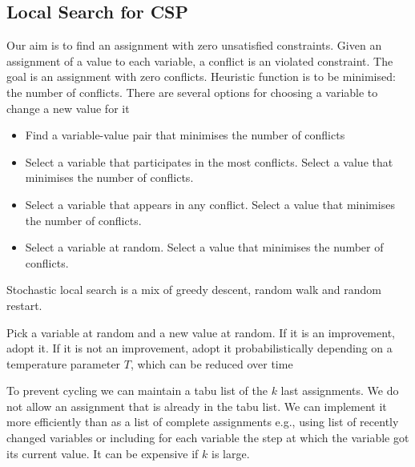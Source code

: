 \documentclass[a4paper]{article}
\theoremstyle{plain}
\theoremstyle{definition}
\newtheorem{defn}{Definition}[section]
\theoremstyle{remark}
\begin{document}
\subsection{Local Search for CSP}
Our aim is to find an assignment with zero unsatisfied constraints. Given an assignment of a value to each variable, a conflict is an violated constraint. The goal is an assignment with zero conflicts. Heuristic function is to be minimised: the number of conflicts. There are several options for choosing a variable to change a new value for it
\begin{itemize}
	\item Find a variable-value pair that minimises the number of conflicts
	\item Select a variable that participates in the most conflicts. Select a value that minimises the number of conflicts.
	\item Select a variable that appears in any conflict. Select a value that minimises the number of conflicts.
	\item Select a variable at random. Select a value that minimises the number of conflicts.
\end{itemize}
\begin{tcolorbox}[colback=black!3!white,colframe=black!60!white,title=\begin{defn}Stochastic Local Search \label{Stochastic Local Search}\end{defn}]
Stochastic local search is a mix of greedy descent, random walk and random restart.
\end{tcolorbox}
\begin{tcolorbox}[colback=black!3!white,colframe=black!60!white,title=\begin{defn}Simulated Annealing \label{Simulated Annealing}\end{defn}]
Pick a variable at random and a new value at random. If it is an improvement, adopt it. If it is not an improvement, adopt it probabilistically depending on a temperature parameter $T$, which can be reduced over time
\end{tcolorbox}
\begin{tcolorbox}[colback=black!3!white,colframe=black!60!white,title=\begin{defn}Tabu Lists \label{Tabu Lists}\end{defn}]
To prevent cycling we can maintain a tabu list of the $k$ last assignments. We do not allow an assignment that is already in the tabu list. We can implement it more efficiently than as a list of complete assignments e.g., using list of recently changed variables or including for each variable the step at which the variable got its current value. It can be expensive if $k$ is large.
\end{tcolorbox}
\end{document}
